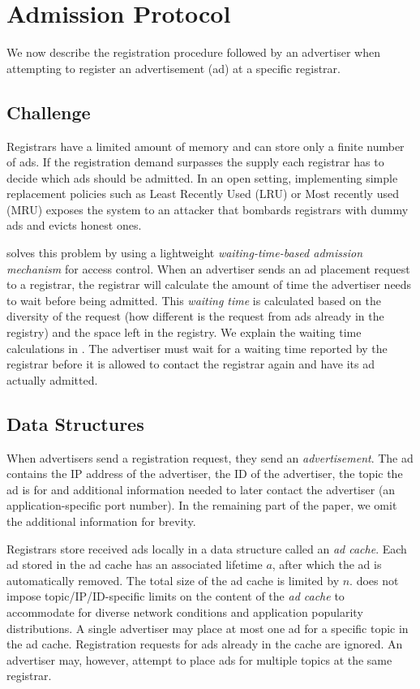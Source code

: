 
\section{Admission Protocol}
\label{sec:admission}

We now describe the registration procedure followed by an advertiser when attempting to register an advertisement (ad) at a specific registrar.

\subsection{Challenge}
Registrars have a limited amount of memory and can store only a finite number of ads. If the registration demand surpasses the supply each registrar has to decide which ads should be admitted. In an open setting, implementing simple replacement policies such as Least Recently Used (LRU) or Most recently used (MRU) exposes the system to an attacker that bombards registrars with dummy ads and evicts honest ones.

\sysname solves this problem by using a lightweight \textit{waiting-time-based admission mechanism} for access control. When an advertiser sends an ad placement request to a registrar, the registrar will calculate the amount of time the advertiser needs to wait before being admitted. This \emph{waiting time} is calculated based on the diversity of the request (\ie how different is the request from ads already in the registry) and the space left in the registry. We explain the waiting time calculations in . The advertiser must wait for a waiting time reported by the registrar before it is allowed to contact the registrar again and have its ad actually admitted.

\subsection{Data Structures}

When advertisers send a registration request, they send an \emph{advertisement}. The ad contains the IP address of the advertiser, the ID of the advertiser, the topic the ad is for and additional information needed to later contact the advertiser (\eg an application-specific port number). In the remaining part of the paper, we omit the additional information for brevity. 

Registrars store received ads locally in a data structure called an \emph{ad cache}. Each ad stored in the ad cache has an associated lifetime $a$, after which the ad is automatically removed. The total size of the ad cache is limited by $n$. \sysname does not impose topic/IP/ID-specific limits on the content of the \emph{ad cache} to accommodate for diverse network conditions and application popularity distributions.
A single advertiser may place at most one ad for a specific topic in the ad cache.
Registration requests for ads already in the cache are ignored.
An advertiser may, however, attempt to place ads for multiple topics at the same registrar.

